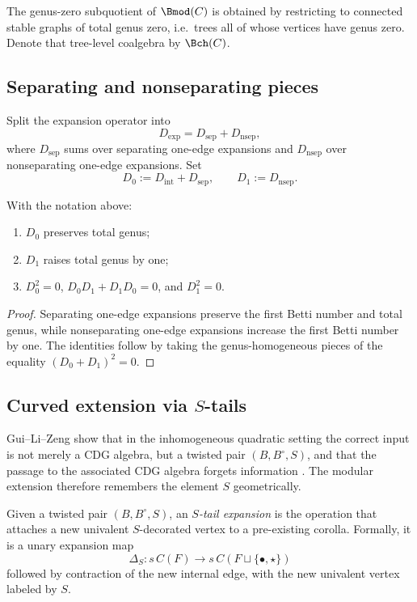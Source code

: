 \begin{remark}
The genus-zero subquotient of $\Bmod(C)$ is obtained by restricting to connected stable
graphs of total genus zero, i.e.\ trees all of whose vertices have genus zero. Denote
that tree-level coalgebra by $\Bch(C)$.
\end{remark}

\subsection{Separating and nonseparating pieces}

Split the expansion operator into
\[
D_{\mathrm{exp}}=D_{\mathrm{sep}}+D_{\mathrm{nsep}},
\]
where $D_{\mathrm{sep}}$ sums over separating one-edge expansions and $D_{\mathrm{nsep}}$
over nonseparating one-edge expansions. Set
\[
D_0:=D_{\mathrm{int}}+D_{\mathrm{sep}},
\qquad
D_1:=D_{\mathrm{nsep}}.
\]

\begin{proposition}\label{prop:D0D1}
With the notation above:
\begin{enumerate}[leftmargin=2.4em]
\item $D_0$ preserves total genus;
\item $D_1$ raises total genus by one;
\item $D_0^2=0$, $D_0D_1+D_1D_0=0$, and $D_1^2=0$.
\end{enumerate}
\end{proposition}

\begin{proof}
Separating one-edge expansions preserve the first Betti number and total genus, while
nonseparating one-edge expansions increase the first Betti number by one. The identities
follow by taking the genus-homogeneous pieces of the equality $(D_0+D_1)^2=0$.
\end{proof}

\subsection{Curved extension via $S$-tails}

Gui--Li--Zeng show that in the inhomogeneous quadratic setting the correct input is not
merely a CDG algebra, but a twisted pair $(B,B^\circ,S)$, and that the passage to the
associated CDG algebra forgets information \cite{GLZ22}. The modular extension
therefore remembers the element $S$ geometrically.

\begin{definition}
Given a twisted pair $(B,B^\circ,S)$, an \emph{$S$-tail expansion} is the operation that
attaches a new univalent $S$-decorated vertex to a pre-existing corolla. Formally, it is
a unary expansion map
\[
\Delta_S:s\,C(F)\to s\,C(F\sqcup \{\bullet,\star\})
\]
followed by contraction of the new internal edge, with the new univalent vertex labeled by $S$.
\end{definition}

